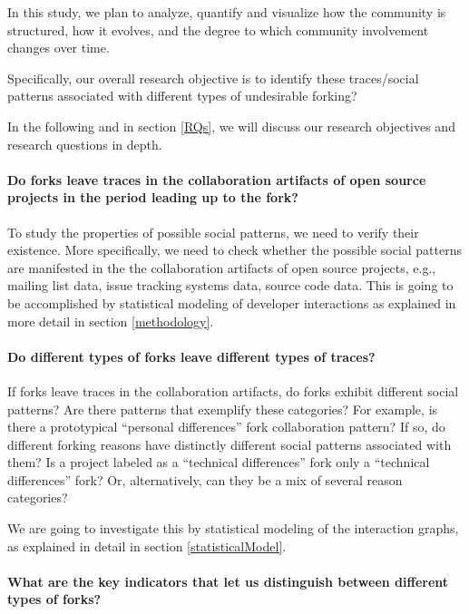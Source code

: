 \documentclass[11pt]{report}
\begin{document}
In this study, we plan to analyze, quantify and visualize how the community is structured, how it evolves, and the degree to which community involvement changes over time.

Specifically, our overall research objective is to identify these traces/social patterns associated with different types of undesirable forking?

In the following and in section \ref{RQs}, we will discuss our research objectives and research questions in depth.

\paragraph*{\hspace{4 mm} Do forks leave traces in the collaboration artifacts of open source projects in the period leading up to the fork?\\}

To study the properties of possible social patterns, we need to verify their existence. More specifically, we need to check whether the possible social patterns are manifested in the the collaboration artifacts of open source projects, e.g., mailing list data, issue tracking systems data, source code data. This is going to be accomplished by statistical modeling of developer interactions as explained in more detail in section \ref{methodology}.

\paragraph*{\hspace{4 mm} Do different types of forks leave different types of traces?\\}

If forks leave traces in the collaboration artifacts, do forks exhibit different social patterns? Are there patterns that exemplify these categories? For example, is there a prototypical ``personal differences'' fork collaboration pattern? If so, do different forking reasons have distinctly different social patterns associated with them? Is a project labeled as a ``technical differences'' fork only a ``technical differences'' fork? Or, alternatively, can they be a mix of several reason categories?

We are going to investigate this by statistical modeling of the interaction graphs, as explained in detail in section \ref{statisticalModel}.

\paragraph*{\hspace{4 mm} What are the key indicators that let us distinguish between different types of forks?\\}
\end{document}
